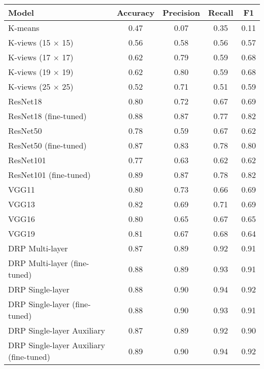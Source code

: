 \begin{tabular}{lcccc}
    \toprule
    Model                                   & Accuracy & Precision & Recall & F1   \\
    \midrule
    K-means                                 & 0.47     & 0.07      & 0.35   & 0.11 \\
    K-views (15 $\times$ 15)                & 0.56     & 0.58      & 0.56   & 0.57 \\
    K-views (17 $\times$ 17)                & 0.62     & 0.79      & 0.59   & 0.68 \\
    K-views (19 $\times$ 19)                & 0.62     & 0.80      & 0.59   & 0.68 \\
    K-views (25 $\times$ 25)                & 0.52     & 0.71      & 0.51   & 0.59 \\
    \hline
    ResNet18                                & 0.80     & 0.72      & 0.67   & 0.69 \\
    ResNet18 (fine-tuned)                   & 0.88     & 0.87      & 0.77   & 0.82 \\
    ResNet50                                & 0.78     & 0.59      & 0.67   & 0.62 \\
    ResNet50 (fine-tuned)                   & 0.87     & 0.83      & 0.78   & 0.80 \\
    ResNet101                               & 0.77     & 0.63      & 0.62   & 0.62 \\
    ResNet101 (fine-tuned)                  & 0.89     & 0.87      & 0.78   & 0.82 \\
    \hline
    VGG11                                   & 0.80     & 0.73      & 0.66   & 0.69 \\
    VGG13                                   & 0.82     & 0.69      & 0.71   & 0.69 \\
    VGG16                                   & 0.80     & 0.65      & 0.67   & 0.65 \\
    VGG19                                   & 0.81     & 0.67      & 0.68   & 0.64 \\
    \hline
    DRP Multi-layer                         & 0.87     & 0.89      & 0.92   & 0.91 \\
    DRP Multi-layer (fine-tuned)            & 0.88     & 0.89      & 0.93   & 0.91 \\
    DRP Single-layer                        & 0.88     & 0.90      & 0.94   & 0.92 \\
    DRP Single-layer (fine-tuned)           & 0.88     & 0.90      & 0.93   & 0.91 \\
    DRP Single-layer Auxiliary              & 0.87     & 0.89      & 0.92   & 0.90 \\
    DRP Single-layer Auxiliary (fine-tuned) & 0.89     & 0.90      & 0.94   & 0.92 \\
    \bottomrule
\end{tabular}
